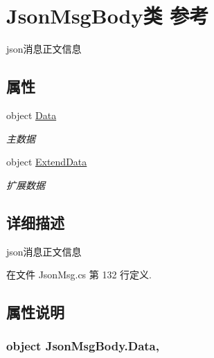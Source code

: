 \hypertarget{class_json_msg_body}{\section{Json\-Msg\-Body类 参考}
\label{class_json_msg_body}
}


json消息正文信息  


\subsection*{属性}
\begin{DoxyCompactItemize}
\item 
object \hyperlink{class_json_msg_body_a1e4b873ccf5992f43af5b6d3e14b9f30}{Data}
\begin{DoxyCompactList}\small\item\em 主数据 \end{DoxyCompactList}\item 
object \hyperlink{class_json_msg_body_a065ec25afa57ebd3ff8424d0a8b6a056}{Extend\-Data}
\begin{DoxyCompactList}\small\item\em 扩展数据 \end{DoxyCompactList}\end{DoxyCompactItemize}


\subsection{详细描述}
json消息正文信息 



在文件 Json\-Msg.\-cs 第 132 行定义.



\subsection{属性说明}
\hypertarget{class_json_msg_body_a1e4b873ccf5992f43af5b6d3e14b9f30}{
\subsubsection[{Data}]{\setlength{\rightskip}{0pt plus 5cm}object Json\-Msg\-Body.\-Data\hspace{0.3cm}{\ttfamily [get]}, {\ttfamily [set]}}}\label{class_json_msg_body_a1e4b873ccf5992f43af5b6d3e14b9f30}


